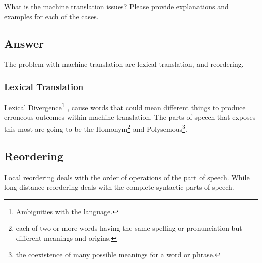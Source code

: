 What is the machine translation issues? Please provide explanations and examples for each of the cases.

\subsection*{Answer}
The problem with machine translation are lexical translation, and reordering. 

\subsubsection*{Lexical Translation}  
Lexical Divergence\footnote{Ambiguities with the language.} , cause words that could mean different things to produce erroneous outcomes within machine translation. 
The parts of speech that exposes this most are going to be the Homonym\footnote{each of two or more words having the same spelling or pronunciation but different meanings and origins.} and Polysemous\footnote{the coexistence of many possible meanings for a word or phrase.}.

\subsection*{Reordering}
Local reordering deals with the order of operations of the part of speech. 
While long distance reordering deals with the complete syntactic parts of speech.

